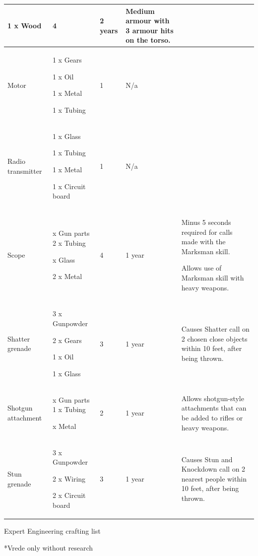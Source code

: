 \begin{table}
\begin{tabular}{|l|l|l|l|l|}
1 x Wood & 4 & 2 years & Medium armour with 3 armour hits on the torso. \\
 \hline Motor & 1 x Gears\par 1 x Oil\par 1 x Metal\par 1 x Tubing & 1 & N/a &  \\
 \hline Radio transmitter & 1 x Glass\par 1 x Tubing\par 1 x Metal\par 1 x Circuit board & 1 & N/a &  \\
 \hline Scope &

x Gun parts 2 x Tubing

x Glass

2 x Metal & 4 & 1 year & Minus 5 seconds required for calls made with the Marksman skill.\par Allows use of Marksman skill with heavy weapons. \\
 \hline Shatter grenade & 3 x Gunpowder\par 2 x Gears\par 1 x Oil\par 1 x Glass & 3 & 1 year & Causes Shatter call on 2 chosen close objects within 10 feet, after being thrown. \\
 \hline Shotgun attachment &

x Gun parts 1 x Tubing

x Metal

 & 2 & 1 year & Allows shotgun-style attachments that can be added to rifles or heavy weapons. \\
 \hline Stun grenade & 3 x Gunpowder\par 2 x Wiring\par 2 x Circuit board & 3 & 1 year & Causes Stun and Knockdown call on 2 nearest people within 10 feet, after being thrown. \\
 \hline \end{tabular}

\end{table}

Expert Engineering crafting list

*Vrede only without research

